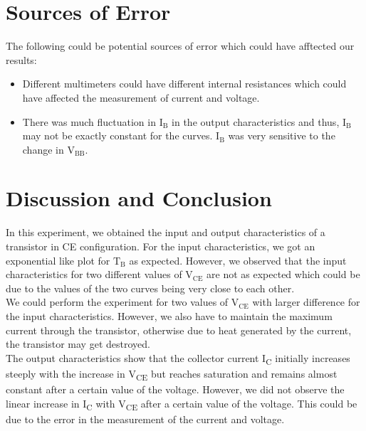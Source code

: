 \documentclass{scrartcl}
\begin{document}
\section{Sources of Error}
The following could be potential sources of error which could have afftected our results:
\begin{itemize}
    \item Different multimeters could have different internal resistances which could have affected the measurement of current and voltage.
    \item There was much fluctuation in $\mathrm{I_B}$ in the output characteristics and thus, $\mathrm{I_B}$ may not be exactly constant for the curves. $\mathrm{I_B}$ was very sensitive to the change in $\mathrm{V_{BB}}$.
\end{itemize}
\section{Discussion and Conclusion}
In this experiment, we obtained the input and output characteristics of a transistor in CE configuration. For the input characteristics, we got an exponential like plot for $\mathrm{T_{B}}$ as expected. However, we observed that the input characteristics for two different values of $\mathrm{V_{CE}}$ are not as expected which could be due to the values of the two curves being very close to each other. \\[0.2cm]
We could perform the experiment for two values of $\mathrm{V_{CE}}$ with larger difference for the input characteristics. However, we also have to maintain the maximum current through the transistor, otherwise due to heat generated by the current, the transistor may get destroyed. \\[0.2cm]
 The output characteristics show that the collector current I\textsubscript{C} initially increases steeply with the increase in V\textsubscript{CE} but reaches saturation and remains almost constant after a certain value of the voltage. However, we did not observe the linear increase in I\textsubscript{C} with V\textsubscript{CE} after a certain value of the voltage. This could be due to the error in the measurement of the current and voltage. 
 
\end{document}
